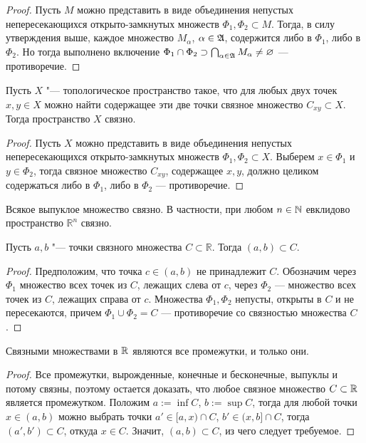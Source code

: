 \begin{proof}
	Пусть $M$ можно представить в виде объединения непустых непересекающихся открыто-замкнутых множеств $\Phi_1, \Phi_2 \subset M$. Тогда, в силу утверждения выше, каждое множество $M_{\alpha}$, $\alpha \in \mathfrak A$, содержится либо в $\Phi_1$, либо в $\Phi_2$. Но тогда выполнено включение $\Phi_1 \cap \Phi_2 \supset \bigcap_{\alpha \in \mathfrak A}M_\alpha \ne \varnothing$ --- противоречие.
\end{proof}

\begin{theorem} \label{theorempathconnected}
	Пусть $X$ "--- топологическое пространство такое, что для любых двух точек $x, y \in X$ можно найти содержащее эти две точки связное множество $C_{xy} \subset X$. Тогда пространство $X$ связно.
\end{theorem}

\begin{proof}
	Пусть $X$ можно представить в виде объединения непустых непересекающихся открыто-замкнутых множеств $\Phi_1, \Phi_2 \subset X$. Выберем $x \in \Phi_1$ и $y \in \Phi_2$, тогда связное множество $C_{xy}$, содержащее $x, y$, должно целиком содержаться либо в $\Phi_1$, либо в $\Phi_2$ --- противоречие.
\end{proof}

\begin{corollary}
	Всякое выпуклое множество связно. В частности, при любом $n \in \mathbb{N}$ евклидово пространство $\mathbb R^n$ связно.
\end{corollary}

\begin{proposition}
	Пусть $a, b$ "--- точки связного множества $C \subset \mathbb{R}$. Тогда $(a, b) \subset C$.
\end{proposition}

\begin{proof}
	Предположим, что точка $c \in (a, b)$ не принадлежит $C$. Обозначим через $\Phi_1$ множество всех точек из $C$, лежащих слева от $c$, через $\Phi_2$ --- множество всех точек из $C$, лежащих справа от $c$. Множества $\Phi_1, \Phi_2$ непусты, открыты в $C$ и не пересекаются, причем $\Phi_1 \cup \Phi_2 = C$ --- противоречие со связностью множества $C$.
\end{proof}

\begin{theorem}
	Связными множествами в $\mathbb{R}$ являются все промежутки, и только они.
\end{theorem}

\begin{proof}
	Все промежутки, вырожденные, конечные и бесконечные, выпуклы и потому связны, поэтому остается доказать, что любое связное множество $C \subset \mathbb{R}$ является промежутком. Положим $a := \inf C$, $b := \sup C$, тогда для любой точки $x \in (a, b)$ можно выбрать точки $a' \in [a, x) \cap C$, $b' \in (x, b] \cap C$, тогда $(a', b') \subset C$, откуда $x \in C$. Значит, $(a, b) \subset C$, из чего следует требуемое.
\end{proof}

